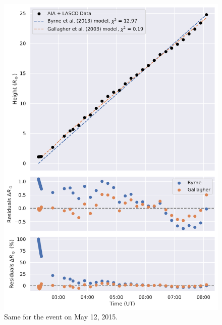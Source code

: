 \begin{figure}[!htp]
	\centering
	\includegraphics[width=0.8\hsize]{chapter2/figs/appendix/height_profile_residuals_aia_lasco_150512_01.pdf}
	\caption{Same for the event on May 12, 2015.}
\end{figure}

